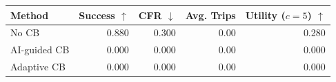 \begin{tabular}{lrrrr}
\toprule
Method & Success $\uparrow$ & CFR $\downarrow$ & Avg. Trips & Utility ($c=5$) $\uparrow$ \\
\midrule
No CB & 0.880 & 0.300 & 0.00 & 0.280 \\
AI-guided CB & 0.000 & 0.000 & 0.00 & 0.000 \\
Adaptive CB & 0.000 & 0.000 & 0.00 & 0.000 \\
\bottomrule
\end{tabular}
